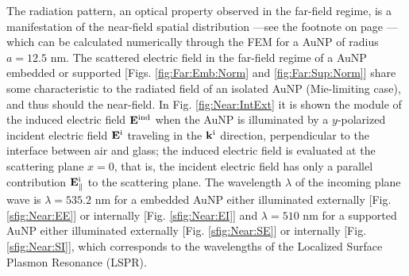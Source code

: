 The radiation pattern, an optical property observed in the far-field regime, is a manifestation of the near-field spatial distribution ---see the footnote on page \pageref{fnote:Stratton:Chu}--- which can be calculated numerically through the FEM for a AuNP of radius $a = 12.5$ nm. The scattered electric field in the  far-field regime of a AuNP embedded or supported  [Figs. \ref{fig:Far:Emb:Norm} and \ref{fig:Far:Sup:Norm}] share some characteristic to the radiated field of an isolated AuNP (Mie-limiting case), and thus should the near-field. In Fig. \ref{fig:Near:IntExt} it is shown the module of the induced electric field $\vb{E}^\text{ind}$ when the AuNP is illuminated by a $y$-polarized incident electric field $\vb{E}^\text{i}$ traveling in the $\vb{k}^\text{i}$ direction, perpendicular to the interface between air and glass; the induced electric field is evaluated at the scattering plane $x = 0$, that is, the incident electric field has only a parallel contribution $\vb{E}^\text{i}_\parallel$ to the scattering plane. The wavelength $\lambda$ of the incoming plane wave is $\lambda =535.2$ nm for a embedded AuNP either illuminated externally [Fig.  \ref{sfig:Near:EE}] or internally  [Fig.  \ref{sfig:Near:EI}] and  $\lambda =510$ nm for a supported AuNP either illuminated externally [Fig.  \ref{sfig:Near:SE}] or internally  [Fig.  \ref{sfig:Near:SI}], which corresponds to the wavelengths of the Localized Surface Plasmon Resonance (LSPR).

